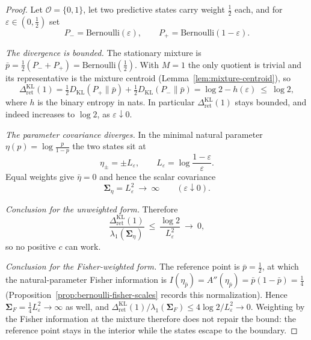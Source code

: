 \documentclass[12pt]{article}
\theoremstyle{definition}
\newcommand{\RetKL}{\Delta_{\mathrm{ret}}^{\mathrm{KL}}}
\begin{document}
\begin{proof}
Let $\mathcal O=\{0,1\}$, let two predictive states carry weight $\tfrac12$
each, and for $\varepsilon\in(0,\tfrac12)$ set
\[
P_-=\mathrm{Bernoulli}(\varepsilon),
\qquad
P_+=\mathrm{Bernoulli}(1-\varepsilon).
\]

\emph{The divergence is bounded.}  The stationary mixture is
$\bar p=\tfrac12(P_-+P_+)=\mathrm{Bernoulli}(\tfrac12)$.  With $M=1$ the only
quotient is trivial and its representative is the mixture centroid
(Lemma~\ref{lem:mixture-centroid}), so
\[
\RetKL(1)
=
\tfrac12D_{\mathrm{KL}}(P_+\|\bar p)+\tfrac12D_{\mathrm{KL}}(P_-\|\bar p)
=
\log2-h(\varepsilon)
\ \le\
\log2,
\]
where $h$ is the binary entropy in nats.  In particular $\RetKL(1)$ stays
bounded, and indeed increases to $\log2$, as $\varepsilon\downarrow0$.

\emph{The parameter covariance diverges.}  In the minimal natural parameter
$\eta(p)=\log\frac{p}{1-p}$ the two states sit at
\[
\eta_\pm=\pm L_\varepsilon,
\qquad
L_\varepsilon=\log\frac{1-\varepsilon}{\varepsilon}.
\]
Equal weights give $\bar\eta=0$ and hence the scalar covariance
\[
\bm{\Sigma}_\eta=L_\varepsilon^2\ \longrightarrow\ \infty
\qquad(\varepsilon\downarrow0).
\]

\emph{Conclusion for the unweighted form.}  Therefore
\[
\frac{\RetKL(1)}{\lambda_1(\bm{\Sigma}_\eta)}
\ \le\
\frac{\log2}{L_\varepsilon^2}
\ \longrightarrow\ 0 ,
\]
so no positive $c$ can work.

\emph{Conclusion for the Fisher-weighted form.}  The reference point is
$\bar p=\tfrac12$, at which the natural-parameter Fisher information is
$I(\eta_{\bar p})=A''(\eta_{\bar p})=\bar p(1-\bar p)=\tfrac14$
(Proposition~\ref{prop:bernoulli-fisher-scales} records this normalization).
Hence $\bm{\Sigma}_F=\tfrac14L_\varepsilon^2\to\infty$ as well, and
$\RetKL(1)/\lambda_1(\bm{\Sigma}_F)\le 4\log2/L_\varepsilon^2\to0$.  Weighting by the
Fisher information at the mixture therefore does not repair the bound: the
reference point stays in the interior while the states escape to the boundary.
\end{proof}
\end{document}
